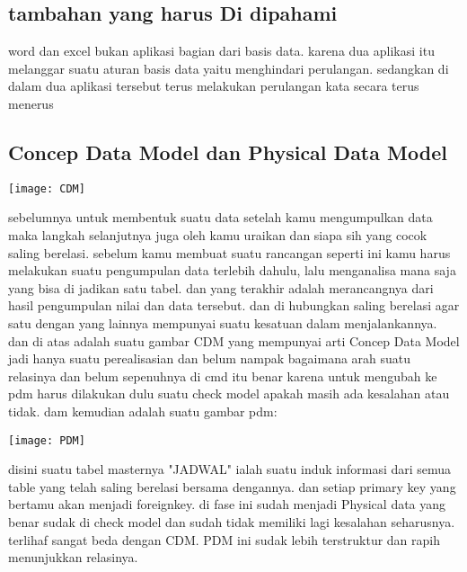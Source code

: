 \documentclass[a4paper,12 pt]{article}
\begin{document}
\subsection{tambahan yang harus Di dipahami}
word dan excel bukan aplikasi bagian dari basis data. karena dua aplikasi itu melanggar suatu aturan basis data yaitu menghindari perulangan. sedangkan di dalam dua aplikasi tersebut terus melakukan perulangan kata secara terus menerus

\subsection{Concep Data Model dan Physical Data Model}
\begin{center}
\texttt{[image: CDM]}
\end{center}
sebelumnya untuk membentuk suatu data setelah kamu mengumpulkan data maka langkah selanjutnya juga oleh kamu uraikan dan siapa sih yang cocok saling berelasi. sebelum kamu membuat suatu rancangan seperti ini kamu harus melakukan suatu pengumpulan data terlebih dahulu, lalu menganalisa mana saja yang bisa di jadikan satu tabel. dan yang terakhir adalah merancangnya dari hasil pengumpulan nilai dan data tersebut. dan di hubungkan saling berelasi agar satu dengan yang lainnya mempunyai suatu kesatuan dalam menjalankannya. 
dan di atas adalah suatu gambar CDM yang mempunyai arti Concep Data Model jadi hanya suatu perealisasian dan belum nampak bagaimana arah suatu relasinya dan belum sepenuhnya di cmd itu benar karena untuk mengubah ke pdm harus dilakukan dulu suatu check model apakah masih ada kesalahan atau tidak. dam kemudian adalah suatu gambar pdm:
\begin{center}
\texttt{[image: PDM]}
\end{center}
disini suatu tabel masternya "JADWAL" ialah suatu induk informasi dari semua table yang telah saling berelasi bersama dengannya. dan setiap primary key yang bertamu akan menjadi foreignkey. 
di fase ini sudah menjadi Physical data yang benar sudak di check model dan sudah tidak memiliki lagi kesalahan seharusnya. terlihaf sangat beda dengan CDM. PDM ini sudak lebih terstruktur dan rapih menunjukkan relasinya.
\end{document}
